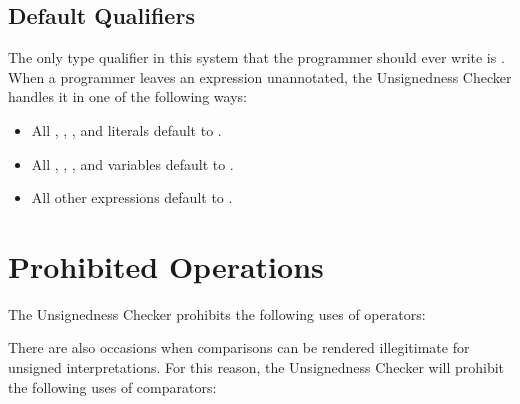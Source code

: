 \subsection{Default Qualifiers\label{unsignedness-checker-annotations-default-qualifiers}}

The only type qualifier in this system that the programmer should ever write is
. When a programmer leaves an expression unannotated, the
Unsignedness Checker handles it in one of the following ways:

\begin{itemize}

    \item
    All , , , and  literals default
    to .
    \item
    All , , , and  variables default
    to .
    \item
    All other expressions default to .

\end{itemize}

\section{Prohibited Operations\label{unsignedness-checker-Prohibited-Operations}}

The Unsignedness Checker prohibits the following uses of operators:


There are also occasions when comparisons can be rendered illegitimate for
unsigned interpretations. For this reason, the Unsignedness Checker will prohibit the following uses of comparators:

